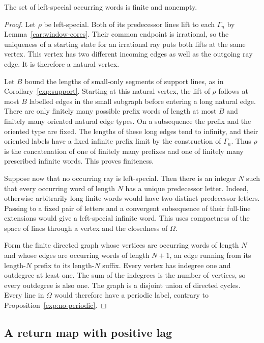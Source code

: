 \begin{lemma}\label{ray:finite}
The set of left-special occurring words is finite and nonempty.
\end{lemma}
\begin{proof}
Let $\rho$ be left-special. Both of its predecessor lines lift to each
$\Gamma_n$ by Lemma~\ref{car:window-cores}. Their common endpoint is
irrational, so the uniqueness of a starting state for an irrational
ray puts both lifts at the same vertex. This vertex has two different
incoming edges as well as the outgoing ray edge. It is therefore a
natural vertex.

Let $B$ bound the lengths of small-only segments of support lines, as in
Corollary~\ref{exp:support}. Starting at this natural vertex, the lift
of $\rho$ follows at most $B$ labelled edges in the small subgraph before
entering a long natural edge. There are only finitely many possible
prefix words of length at most $B$ and finitely many oriented natural
edge types. On a subsequence the prefix and the oriented type are fixed.
The lengths of these long edges tend to infinity, and their oriented
labels have a fixed infinite prefix limit by the construction of
$\Gamma_n$. Thus $\rho$ is the concatenation of one of finitely many
prefixes and one of finitely many prescribed infinite words. This proves
finiteness.

Suppose now that no occurring ray is left-special. Then there is an
integer $N$ such that every occurring word of length $N$ has a unique
predecessor letter. Indeed, otherwise arbitrarily long finite words
would have two distinct predecessor letters. Passing to a fixed pair
of letters and a convergent subsequence of their full-line extensions
would give a left-special infinite word. This uses compactness of the
space of lines through a vertex and the closedness of $\Omega$.

Form the finite directed graph whose vertices are occurring words of
length $N$ and whose edges are occurring words of length $N+1$, an edge
running from its length-$N$ prefix to its length-$N$ suffix. Every vertex
has indegree one and outdegree at least one. The sum of the indegrees is
the number of vertices, so every outdegree is also one. The graph is a
disjoint union of directed cycles. Every line in $\Omega$ would therefore
have a periodic label, contrary to Proposition~\ref{exp:no-periodic}.
\end{proof}

\subsection{A return map with positive lag}

